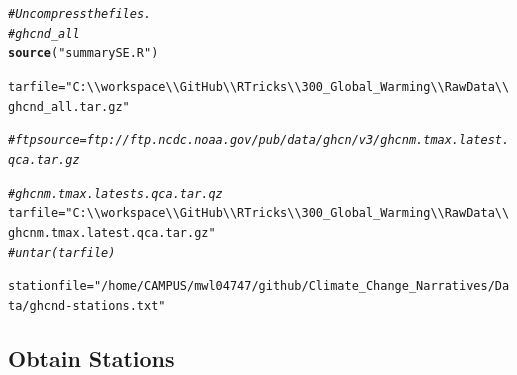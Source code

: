 \documentclass{article}\usepackage[]{graphicx}\usepackage[]{color}
\makeatletter
\newcommand{\hlstr}[1]{\textcolor[rgb]{0.192,0.494,0.8}{#1}}%
\newcommand{\hlcom}[1]{\textcolor[rgb]{0.678,0.584,0.686}{\textit{#1}}}%
\newcommand{\hlstd}[1]{\textcolor[rgb]{0.345,0.345,0.345}{#1}}%
\newcommand{\hlkwb}[1]{\textcolor[rgb]{0.69,0.353,0.396}{#1}}%
\newcommand{\hlkwd}[1]{\textcolor[rgb]{0.737,0.353,0.396}{\textbf{#1}}}%
\newenvironment{kframe}{%
 \def\at@end@of@kframe{}%
 \ifinner\ifhmode%
  \def\at@end@of@kframe{\end{minipage}}%
  \begin{minipage}{\columnwidth}%
 \fi\fi%
 \def\FrameCommand##1{\hskip\@totalleftmargin \hskip-\fboxsep
 \colorbox{shadecolor}{##1}\hskip-\fboxsep
     \hskip-\linewidth \hskip-\@totalleftmargin \hskip\columnwidth}%
 \MakeFramed {\advance\hsize-\width
   \@totalleftmargin\z@ \linewidth\hsize
   \@setminipage}}%
 {\par\unskip\endMakeFramed%
 \at@end@of@kframe}
\newenvironment{knitrout}{}{} %
\makeatother
\begin{document}
\begin{knitrout}
\color{fgcolor}\begin{kframe}
\begin{alltt}
\hlcom{# Uncompress the files.}
\hlcom{# ghcnd_all}
\hlkwd{source}\hlstd{(}\hlstr{"summarySE.R"}\hlstd{)}

\hlstd{tarfile} \hlkwb{=} \hlstr{"C:\textbackslash{}\textbackslash{}workspace\textbackslash{}\textbackslash{}GitHub\textbackslash{}\textbackslash{}RTricks\textbackslash{}\textbackslash{}300_Global_Warming\textbackslash{}\textbackslash{}Raw Data\textbackslash{}\textbackslash{}ghcnd_all.tar.gz"}

\hlcom{#ftpsource = ftp://ftp.ncdc.noaa.gov/pub/data/ghcn/v3/ghcnm.tmax.latest.qca.tar.gz}


\hlcom{#ghcnm.tmax.latests.qca.tar.qz}
\hlstd{tarfile} \hlkwb{=} \hlstr{"C:\textbackslash{}\textbackslash{}workspace\textbackslash{}\textbackslash{}GitHub\textbackslash{}\textbackslash{}RTricks\textbackslash{}\textbackslash{}300_Global_Warming\textbackslash{}\textbackslash{}Raw Data\textbackslash{}\textbackslash{}ghcnm.tmax.latest.qca.tar.gz"}
\hlcom{# untar(tarfile)}
\end{alltt}
\end{kframe}
\end{knitrout}


\begin{knitrout}
\color{fgcolor}\begin{kframe}
\begin{alltt}
\hlstd{stationfile} \hlkwb{=} \hlstr{"/home/CAMPUS/mwl04747/github/Climate_Change_Narratives/Data/ghcnd-stations.txt"}
\end{alltt}
\end{kframe}
\end{knitrout}

\subsection{Obtain Stations}
\end{document}
